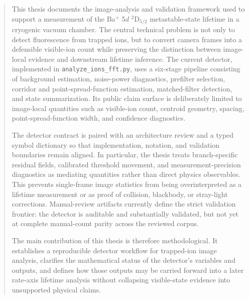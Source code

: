 \documentclass[12pt]{report}
\begin{document}
\begin{abstract}

This thesis documents the image-analysis and validation framework used to support a measurement of the Ba$^+$ 5$d$ $^2$D$_{5/2}$ metastable-state lifetime in a cryogenic vacuum chamber. The central technical problem is not only to detect fluorescence from trapped ions, but to convert camera frames into a defensible visible-ion count while preserving the distinction between image-local evidence and downstream lifetime inference. The current detector, implemented in \texttt{analyze\_ions\_fft.py}, uses a six-stage pipeline consisting of background estimation, noise-power diagnostics, prefilter selection, corridor and point-spread-function estimation, matched-filter detection, and state summarization. Its public claim surface is deliberately limited to image-local quantities such as visible-ion count, centroid geometry, spacing, point-spread-function width, and confidence diagnostics.

The detector contract is paired with an architecture review and a typed symbol dictionary so that implementation, notation, and validation boundaries remain aligned. In particular, the thesis treats branch-specific residual fields, calibrated threshold movement, and measurement-precision diagnostics as mediating quantities rather than direct physics observables. This prevents single-frame image statistics from being overinterpreted as a lifetime measurement or as proof of collision, blackbody, or stray-light corrections. Manual-review artifacts currently define the strict validation frontier: the detector is auditable and substantially validated, but not yet at complete manual-count parity across the reviewed corpus.

The main contribution of this thesis is therefore methodological. It establishes a reproducible detector workflow for trapped-ion image analysis, clarifies the mathematical status of the detector's variables and outputs, and defines how those outputs may be carried forward into a later rate-axis lifetime analysis without collapsing visible-state evidence into unsupported physical claims.

\end{abstract}


\end{document}

